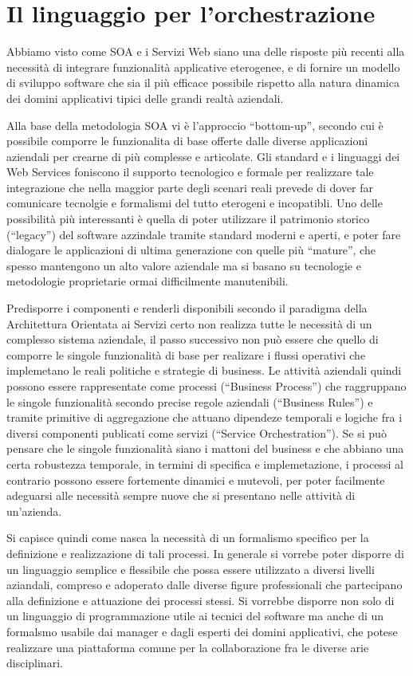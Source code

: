 \chapter{Il linguaggio per l'orchestrazione}

Abbiamo visto come SOA e i Servizi Web siano una delle risposte più recenti
alla necessità di integrare funzionalità applicative eterogenee, e di fornire
un modello di sviluppo software che sia il pi\`u efficace possibile rispetto
alla natura dinamica dei domini applicativi tipici delle grandi realtà
aziendali.

Alla base della metodologia SOA vi è l'approccio ``bottom-up'', secondo cui è
possibile comporre le funzionalita di base offerte dalle diverse applicazioni
aziendali per crearne di più complesse e articolate. Gli standard e i linguaggi
dei Web Services foniscono il supporto tecnologico e formale per realizzare tale
integrazione che nella maggior parte degli scenari reali prevede di dover far
comunicare tecnolgie e formalismi del tutto eterogeni e incopatibli. Uno delle
possibilità più interessanti è quella di poter utilizzare il patrimonio storico
(``legacy'') del software azzindale tramite standard moderni e aperti, e poter
fare dialogare le applicazioni di ultima generazione con quelle più ``mature'',
che spesso mantengono un alto valore aziendale ma si basano su tecnologie e
metodologie proprietarie ormai difficilmente manutenibili.

Predisporre i componenti e renderli disponibili secondo il paradigma della
Architettura Orientata ai Servizi certo non realizza tutte le necessità di un
complesso sistema aziendale, il passo successivo non può essere che quello di
comporre le singole funzionalità di base per realizare i flussi operativi che
implemetano le reali politiche e strategie di business. Le attività aziendali
quindi possono essere rappresentate come processi (``Business Process'') che
raggruppano le singole funzionalità secondo precise regole aziendali (``Business
Rules'') e tramite primitive di aggregazione che attuano dipendeze temporali e
logiche fra i diversi componenti publicati come servizi (``Service
Orchestration''). Se si può pensare che le singole funzionalità siano i mattoni
del business e che abbiano una certa robustezza temporale, in termini di
specifica e implemetazione, i processi al contrario possono essere fortemente
dinamici e mutevoli, per poter facilmente adeguarsi alle necessità sempre nuove
che si presentano nelle attività di un'azienda.

Si capisce quindi come nasca la necessità di un formalismo specifico per la
definizione e realizzazione di tali processi. In generale si vorrebe poter
disporre di un linguaggio semplice e flessibile che possa essere utilizzato a
diversi livelli aziandali, compreso e adoperato dalle diverse figure
professionali che partecipano alla definizione e attuazione dei processi
stessi. Si vorrebbe disporre non solo di un linguaggio di programmazione
utile ai tecnici del software ma anche di un formalsmo usabile dai manager e
dagli esperti dei domini applicativi, che potese realizzare una piattaforma comune
per la collaborazione fra le diverse arie disciplinari.

